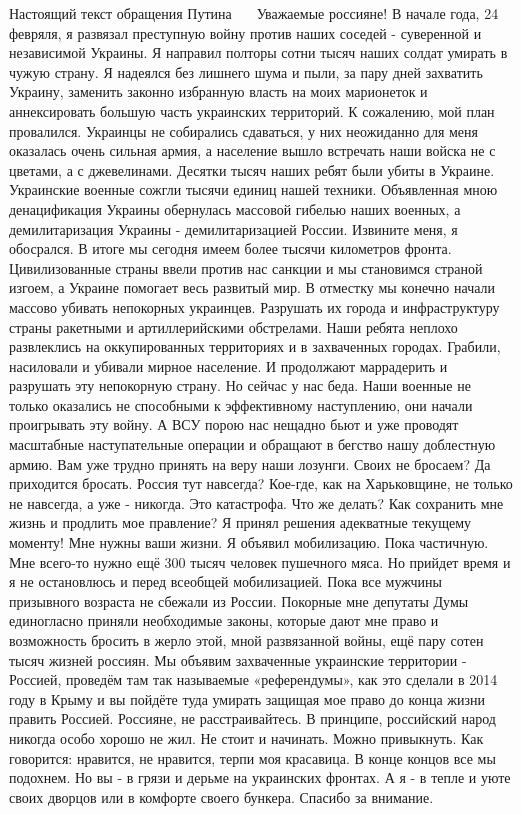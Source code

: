 Настоящий текст обращения Путина 🤡🤡🤡🤡
Уважаемые россияне!
В начале года, 24 февряля, я развязал преступную войну против наших соседей - суверенной и независимой Украины. Я направил полторы сотни тысяч наших солдат умирать в чужую страну.
Я надеялся без лишнего шума и пыли, за пару дней захватить Украину, заменить законно избранную власть на моих марионеток и аннексировать большую часть украинских территорий.
К сожалению, мой план провалился.
Украинцы не собирались сдаваться, у них неожиданно для меня оказалась очень сильная армия, а население вышло встречать наши войска не с цветами, а с джевелинами.
Десятки тысяч наших ребят были убиты в Украине. Украинские военные сожгли тысячи единиц нашей техники. Объявленная мною денацификация Украины обернулась массовой гибелью наших военных, а демилитаризация Украины - демилитаризацией России.
Извините меня, я обосрался.
В итоге мы сегодня имеем более тысячи километров фронта.
Цивилизованные страны ввели против нас санкции и мы становимся страной изгоем, а Украине помогает весь развитый мир.
В отместку мы конечно начали массово убивать непокорных украинцев. Разрушать их города и инфраструктуру страны ракетными и артиллерийскими обстрелами. Наши ребята неплохо развлеклись на оккупированных территориях и в захваченных городах. Грабили, насиловали и убивали мирное население. И продолжают маррадерить и разрушать эту непокорную страну.
Но сейчас у нас беда. Наши военные не только оказались не способными к эффективному наступлению, они начали проигрывать эту войну. А ВСУ порою нас нещадно бьют и уже проводят масштабные наступательные операции и обращают в бегство нашу доблестную армию.
Вам уже трудно принять на веру наши лозунги.
Своих не бросаем? Да приходится бросать.
Россия тут навсегда? Кое-где, как на Харьковщине, не только не навсегда, а уже - никогда.
Это катастрофа.
Что же делать? Как сохранить мне жизнь и продлить мое правление?
Я принял решения адекватные текущему моменту!
Мне нужны ваши жизни. Я объявил мобилизацию. Пока частичную.
Мне всего-то нужно ещё 300 тысяч человек пушечного мяса.
Но прийдет время и я не остановлюсь и перед всеобщей мобилизацией. Пока все мужчины призывного возраста не сбежали из России.
Покорные мне депутаты Думы единогласно приняли необходимые законы, которые дают мне право и возможность бросить в жерло этой, мной развязанной войны, ещё пару сотен тысяч жизней россиян.
Мы объявим захваченные украинские территории - Россией, проведём там так называемые «референдумы», как это сделали в 2014 году в Крыму и вы пойдёте туда умирать защищая мое право до конца жизни править Россией.
Россияне, не расстраивайтесь. В принципе, российский народ никогда особо хорошо не жил. Не стоит и начинать. Можно привыкнуть. Как говорится: нравится, не нравится, терпи моя красавица.
В конце концов все мы подохнем. Но вы - в грязи и дерьме на украинских фронтах. А я - в тепле и уюте своих дворцов или в комфорте своего бункера.
Спасибо за внимание.

